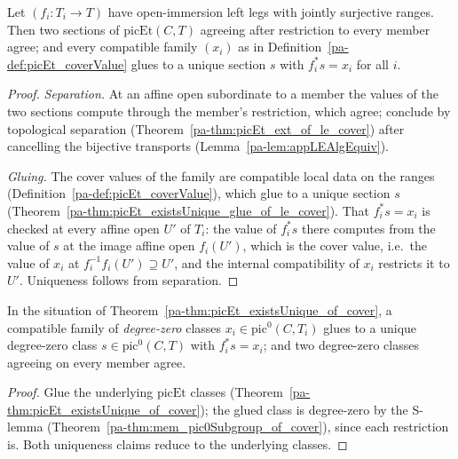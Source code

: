 \begin{theorem}
  \label{pa-thm:picEt_existsUnique_of_cover}
  \leanok

  Let \((f_i \colon T_i \to T)\) have open-immersion left legs with jointly surjective
  ranges. Then two sections of \(\mathrm{picEt}(C,T)\) agreeing after restriction to every
  member agree; and every compatible family \((x_i)\) as in
  Definition~\ref{pa-def:picEt_coverValue} glues to a unique section \(s\) with
  \(f_i^{*} s = x_i\) for all \(i\).
\end{theorem}
\begin{proof}
  \leanok
  \emph{Separation.} At an affine open subordinate to a member the values of the two
  sections compute through the member's restriction, which agree; conclude by topological
  separation (Theorem~\ref{pa-thm:picEt_ext_of_le_cover}) after cancelling the bijective
  transports (Lemma~\ref{pa-lem:appLEAlgEquiv}).

  \emph{Gluing.} The cover values of the family are compatible local data on the ranges
  (Definition~\ref{pa-def:picEt_coverValue}), which glue to a unique section \(s\)
  (Theorem~\ref{pa-thm:picEt_existsUnique_glue_of_le_cover}). That \(f_i^{*} s = x_i\) is
  checked at every affine open \(U'\) of \(T_i\): the value of \(f_i^{*}s\) there computes
  from the value of \(s\) at the image affine open \(f_i(U')\), which is the cover value,
  i.e.\ the value of \(x_i\) at \(f_i^{-1}f_i(U') \supseteq U'\), and the internal
  compatibility of \(x_i\) restricts it to \(U'\). Uniqueness follows from separation.
\end{proof}

\begin{theorem}
  \label{pa-thm:pic0Subgroup_existsUnique_of_cover}
  \leanok

  In the situation of Theorem~\ref{pa-thm:picEt_existsUnique_of_cover}, a compatible family of
  \emph{degree-zero} classes \(x_i \in \mathrm{pic}^0(C, T_i)\) glues to a unique degree-zero
  class \(s \in \mathrm{pic}^0(C,T)\) with \(f_i^{*} s = x_i\); and two degree-zero classes
  agreeing on every member agree.
\end{theorem}
\begin{proof}
  \leanok
  Glue the underlying \(\mathrm{picEt}\) classes
  (Theorem~\ref{pa-thm:picEt_existsUnique_of_cover}); the glued class is degree-zero by the
  S-lemma (Theorem~\ref{pa-thm:mem_pic0Subgroup_of_cover}), since each restriction is. Both
  uniqueness claims reduce to the underlying classes.
\end{proof}

